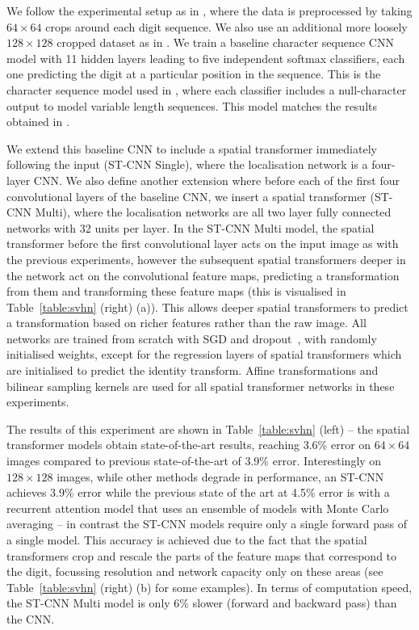 \documentclass{article} %
\newcommand{\tblref}[1]{Table~\ref{#1}}
\begin{document}
We follow the experimental setup as in \cite{Goodfellow13,Ba14}, where the data
is preprocessed by taking $64\times 64$ crops around each digit sequence. We
also use an additional more loosely $128\times 128$ cropped dataset as in
\cite{Ba14}. We train a baseline character sequence CNN model with 11 hidden
layers leading to five independent softmax classifiers, each one predicting the
digit at a particular position in the sequence. This is the character sequence
model used in \cite{Jaderberg14c}, where each classifier includes a null-character output to model variable length sequences. This model matches the
results obtained in \cite{Goodfellow13}.

We extend this baseline CNN to include a spatial transformer immediately
following the input (ST-CNN Single), where the localisation network is a
four-layer CNN. We also define another extension where before each of the first
four convolutional layers of the baseline CNN, we insert a spatial transformer
(ST-CNN Multi), where the localisation networks are all two layer fully
connected networks with 32 units per layer. In the ST-CNN Multi model, the
spatial transformer before the first convolutional layer acts on the input image
as with the previous experiments, however the subsequent spatial transformers
deeper in the network act on the convolutional feature maps, predicting a
transformation from them and transforming these feature maps (this is visualised
in \tblref{table:svhn} (right) (a)). This allows deeper spatial transformers to predict 
a transformation based on richer features rather than the raw image. All networks are trained from scratch with
SGD and dropout~\cite{Hinton12}, with randomly initialised weights, except for
the regression layers of spatial transformers which are initialised to predict
the identity transform. Affine transformations and bilinear sampling kernels are
used for all spatial transformer networks in these experiments.

The results of this experiment are shown in \tblref{table:svhn} (left) -- the
spatial transformer models obtain state-of-the-art results, reaching 3.6\% error
on $64 \times 64$ images compared to previous state-of-the-art of 3.9\% error.
Interestingly on $128\times 128$ images, while other methods degrade in
performance, an ST-CNN achieves 3.9\% error while the previous state of the art at
4.5\% error is with a recurrent attention model that uses an ensemble of models with
Monte Carlo averaging -- in contrast the ST-CNN models require only a single forward pass
of a single model. This accuracy is achieved due to the fact that the spatial
transformers crop and rescale the parts of the feature maps that correspond to
the digit, focussing resolution and network capacity only on these areas (see
\tblref{table:svhn} (right) (b) for some examples). In terms of computation speed, the ST-CNN Multi model is only 6\% slower (forward and backward pass) than the CNN.
\end{document}
